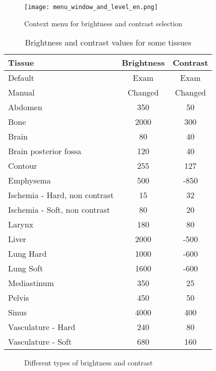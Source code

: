 \begin{figure}[!htb]
\centering
\texttt{[image: menu\_window\_and\_level\_en.png]}
\caption{Context menu for brightness and contrast selection}
\label{fig:window_level}
\end{figure}

\begin{table}[h]
\centering
\caption{Brightness and contrast values for some tissues}
\begin{tabular}{lcc}\\
\hline %
Tissue & Brightness & Contrast\\
\hline
\hline
Default & Exam & Exam\\
Manual & Changed & Changed\\
Abdomen & 350 & 50\\
Bone & 2000 & 300\\
Brain & 80 & 40\\
Brain posterior fossa & 120 & 40\\
Contour & 255 & 127\\
Emphysema & 500 & -850\\
Ischemia - Hard, non contrast & 15 & 32\\
Ischemia - Soft, non contrast & 80 & 20\\
Larynx & 180 & 80\\
Liver & 2000 & -500\\
Lung Hard & 1000 & -600\\
Lung Soft & 1600 & -600\\
Mediastinum & 350 & 25\\
Pelvis & 450 & 50\\
Sinus & 4000 & 400\\
Vasculature - Hard & 240 & 80\\
Vasculature - Soft & 680 & 160\\
\hline
\end{tabular}
\label{tab:window_level}
\end{table} 

\newpage

\begin{figure}
  \centering
  \caption{Different types of brightness and contrast}
  \label{fig:two_window_level}
\end{figure}



